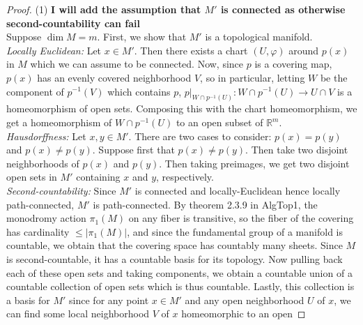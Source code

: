 \documentclass[reqno]{amsart}
\theoremstyle{definition}
\theoremstyle{remark}
\begin{document}
    \begin{proof}
        (1) \textbf{I will add the assumption that $M'$ is
        connected as otherwise second-countability can fail}\\

        Suppose $\dim M = m$. First, we show that
        $M'$ is a topological manifold.\\
        \textit{Locally Euclidean:} 
        Let $x \in M'$. Then there exists a chart
        $\left( U, \varphi  \right) $ around
        $p(x)$ in $M$ which we
        can assume to be connected. Now, since  $p$ is a covering map,
        $p(x)$ has an evenly covered neighborhood
        $V$, so in particular, letting
        $W$ be the component of
        $p^{-1}(V)$ which contains $p$, 
        $p|_{W \cap p^{-1}(U)} \colon
        W \cap p^{-1}(U) \to U \cap V$ is a homeomorphism of
        open sets. Composing this with the chart homeomorphism,
        we get a homeomorphism of
        $W \cap p^{-1}(U)$ to an open subset of
        $\mathbb{R}^{m}$.\\
        \linebreak
        \textit{Hausdorffness:} Let
        $x,y \in M'$. There are two cases to consider:
        $p(x) = p(y)$ and $p(x) \neq p(y)$.
        Suppose first that $p(x) \neq p(y)$.
        Then take two disjoint neighborhoods of
        $p(x)$ and $p(y)$.
        Then taking preimages, we get two disjoint open sets
        in $M'$ containing $x$ and $y$, respectively.\\
        \linebreak
        \textit{Second-countability:} Since
        $M'$ is connected and locally-Euclidean hence
        locally path-connected, $M'$ is path-connected.
        By theorem 2.3.9 in AlgTop1, the monodromy action
        $\pi_1(M)$ on any fiber is transitive, so
        the fiber of the covering has cardinality
        $\le \left| \pi_1(M) \right| $, and since
        the fundamental group of a manifold is countable, we
        obtain that the covering space has countably
        many sheets. Since
        $M$ is second-countable, it has a countable
        basis for its topology. Now
        pulling back each of these open sets and taking components,
        we obtain a countable union of a countable collection
        of open sets which is thus countable. Lastly,
        this collection is a basis for $M'$ since for
        any point $x \in M'$ and any open neighborhood
        $U$ of $x$, we can find some
        local neighborhood $V$ of $x$ homeomorphic to an open

\end{proof}
\end{document}
